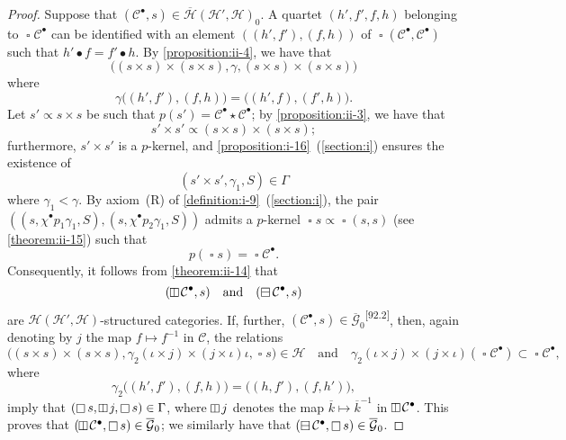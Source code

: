 \documentclass[a4paper,fleqn]{article}
\makeatletter
\theoremstyle{plain}
\theoremstyle{definition}
\def\blfootnote{\xdef\@thefnmark{}\@footnotetext}
\newcommand{\comm}[2]{{\normalfont\textsuperscript{[#1]}}\blfootnote{\label{footnote:#1}\textbf{[#1]} #2}}
\newcommand{\textand}{\quad\text{and}\quad}
\newcommand{\CC}{\mathcal{C}}
\newcommand{\HH}{\mathcal{H}}
\newcommand{\subs}{\mathrel{\propto}}
\newcommand{\GG}{\mathcal{G}}
\newcommand{\hsqbox}{{\boxminus}}
\newcommand{\vsqbox}{{\rotatebox{90}{$\boxminus$}}}
\DeclareMathOperator{\sq}{\square}
\DeclareMathOperator{\hsq}{\raisebox{-.05em}{$\hsqbox$}}
\DeclareMathOperator{\vsq}{\raisebox{-.1em}{$\vsqbox$}}
\newcommand{\smallbullet}{\bullet}
\makeatother
\begin{document}
\begin{proof}
  Suppose that $(\CC^\smallbullet,s)\in\overline{\HH}(\HH',\HH)_0$.
  A quartet $(h',f',f,h)$ belonging to $\sq\CC^\smallbullet$ can be identified with an element $((h',f'),(f,h))$ of $\sq(\CC^\smallbullet,\CC^\smallbullet)$ such that $h'\smallbullet f=f'\smallbullet h$.
  By \cref{proposition:ii-4}, we have that
  \[
    \big(
      (s\times s)\times(s\times s),
      \gamma,
      (s\times s)\times(s\times s)
    \big)
  \]
  where
  \[
    \gamma\big((h',f'),(f,h)\big)
    = \big((h',f),(f',h)\big).
  \]
  Let $s'\subs s\times s$ be such that $p(s')=\CC^\smallbullet\star\CC^\smallbullet$;
  by \cref{proposition:ii-3}, we have that
  \[
    s'\times s'
    \subs (s\times s)\times(s\times s);
  \]
  furthermore, $s'\times s'$ is a $p$-kernel, and \cref{proposition:i-16}~(\cref{section:i}) ensures the existence of
  \[
    (s'\times s',\gamma_1,S)
    \in\Gamma
  \]
  where $\gamma_1<\gamma$.
  By axiom~(R) of \cref{definition:i-9}~(\cref{section:i}), the pair $((s,\chi^\smallbullet p_1\gamma_1,S),(s,\chi^\smallbullet p_2\gamma_1,S))$ admits a $p$-kernel $\sq s\subs\sq(s,s)$ (see \cref{theorem:ii-15}) such that
  \[
    p(\sq s) = \sq\CC^\smallbullet.
  \]
  Consequently, it follows from \cref{theorem:ii-14} that
  \[
    (\vsq\CC^\smallbullet,s)
    \textand
    (\hsq\CC^\smallbullet,s)
  \]
  are $\HH(\HH',\HH)$-structured categories.
  If, further, $(\CC^\smallbullet,s)\in\overline{\GG}_0$\comm{92.2}{$\overline{\GG}=\overline{\GG}(\HH,\HH)$ by definition.}, then, again denoting by $j$ the map $f\mapsto f^{-1}$ in $\CC$, the relations
  \[
    \big(
      (s\times s)\times(s\times s),
      \gamma_2(\iota\times j)\times(j\times\iota)\iota,
      \sq s
    \big)
    \in\HH
    \textand
    \gamma_2(\iota\times j)\times(j\times\iota)(\sq\CC^\smallbullet)
    \subset\sq\CC^\smallbullet,
  \]
  where
  \[
    \gamma_2\big((h',f'),(f,h)\big)
    = \big((h,f'),(f,h')\big),
  \]
  imply that $(\sq s,\vsq j,\sq s)\in\Gamma$, where $\vsq j$ denotes the map $\overline{k}\mapsto\overline{k}^{-1}$ in $\vsq\CC^\smallbullet$.
  This proves that $(\vsq\CC^\smallbullet,\sq s)\in\overline{\GG}_0$;
  we similarly have that $(\hsq\CC^\smallbullet,\sq s)\in\overline{\GG}_0$.


\end{proof}
\end{document}
